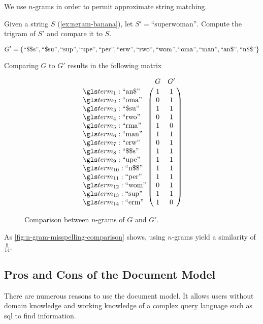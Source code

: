 		We use \(n\)-grams in order to permit approximate string matching.
		
		\begin{ex}
		\label{ex:n-gram-comparison}
			Given a string \(S\) (\vref{ex:ngram-banana}), let \(S' = \text{``superwoman''}\).  Compute the trigram of \(S'\) and compare it to \(S\).
			
			\[
				G' = \{
					\text{``\char"24\char"24s''},
					\text{``\char"24su''},
					\text{``sup''},
					\text{``upe''},
					\text{``per''},
					\text{``erw''},
					\text{``rwo''},
					\text{``wom''},
					\text{``oma''},
					\text{``man''},
					\text{``an\char"24''},
					\text{``n\char"24\char"24''}
				\}
			\]
			
			Comparing \(G\) to \(G'\) results in the following matrix
			
			\begin{figure}[!ht]
				\[
					\bordermatrix{
						~ & G & G' \cr
						\term_1 : \text{``an\char"24''} & 1 & 1 \cr
						\term_2 : \text{``oma''} & 0 & 1 \cr
						\term_3 : \text{``\char"24su''} & 1 & 1 \cr
						\term_4 : \text{``rwo''} & 0 & 1 \cr
						\term_5 : \text{``rma''} & 1 & 0 \cr
						\term_6 : \text{``man''} & 1 & 1 \cr
						\term_7 : \text{``erw''} & 0 & 1 \cr
						\term_8 : \text{``\char"24\char"24s''} & 1 & 1 \cr
						\term_9 : \text{``upe''} & 1 & 1 \cr
						\term_{10} : \text{``n\char"24\char"24''} & 1 & 1 \cr
						\term_{11} : \text{``per''} & 1 & 1 \cr
						\term_{12} : \text{``wom''} & 0 & 1 \cr
						\term_{13} : \text{``sup''} & 1 & 1 \cr
						\term_{14} : \text{``erm''} & 1 & 0 \cr
					}
				\]
				
				\caption{Comparison between \(n\)-grams of \(G\) and \(G'\).}
				\label{fig:n-gram-misspelling-comparison}
			\end{figure}
			
			As \vref{fig:n-gram-misspelling-comparison} shows, using \(n\)-grams yield a similarity of \(\frac{8}{14}\).
		\end{ex}
			
	\subsection{Pros and Cons of the Document Model}
		There are numerous reasons to use the document model.  It allows users without domain knowledge and working knowledge of a complex query language such as \gls{sql} to find information. 
		
